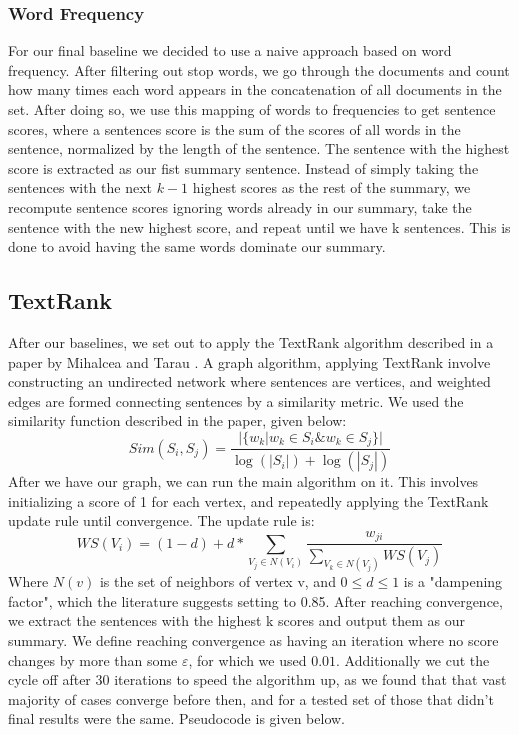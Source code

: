 \documentclass[10pt]{article}
\begin{document}
\subsubsection{Word Frequency}
For our final baseline we decided to use a naive approach based on word frequency. After filtering out stop words, we go through the documents and count how many times each word appears in the concatenation of all documents in the set. After doing so, we use this mapping of words to frequencies to get sentence scores, where a sentences score is the sum of the scores of all words in the sentence, normalized by the length of the sentence. The sentence with the highest score is extracted as our fist summary sentence. Instead of simply taking the sentences with the next $k-1$ highest scores as the rest of the summary, we recompute sentence scores ignoring words already in our summary, take the sentence with the new highest score, and repeat until we have k sentences. This is done to avoid having the same words dominate our summary.

\subsection{TextRank}
After our baselines, we set out to apply the TextRank algorithm described in a paper by Mihalcea and Tarau \cite{textrank}. A graph algorithm, applying TextRank involve constructing an undirected network where sentences are vertices, and weighted edges are formed connecting sentences by a similarity metric.
We used the similarity function described in the paper, given below:
$$Sim(S_i, S_j) = \frac{| \{ w_k | w_k \in S_i \& w_k \in S_j\}|}{\log(|S_i|) + \log(|S_j|)}$$
After we have our graph, we can run the main algorithm on it. This involves initializing a score of 1 for each vertex, and repeatedly applying the TextRank update rule until convergence. The update rule is:
$$ WS(V_i) = (1 - d) + d* \sum_{V_j \in N(V_i)} \frac{w_{ji}}{\sum_{V_k \in N(V_j)} WS(V_j)}$$
Where $N(v)$ is the set of neighbors of vertex v, and $0 \leqslant d \leqslant 1$ is a "dampening factor", which the literature suggests setting to 0.85. After reaching convergence, we extract the sentences with the highest k scores and output them as our summary.  We define reaching convergence as having an iteration where no score changes by more than some $\varepsilon$, for which we used $0.01$. Additionally we cut the cycle off after 30 iterations to speed the algorithm up, as we found that that vast majority of cases converge before then, and for a tested set of those that didn't final results were the same. Pseudocode is given below.
\end{document}
